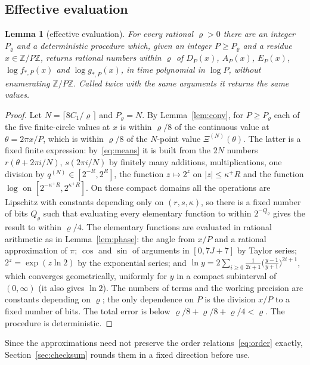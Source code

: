 \documentclass[11pt]{article}
\newtheorem{lemma}{Lemma}[section]
\theoremstyle{definition}
\newcommand{\Z}{\mathbb Z}
\newcommand{\abs}[1]{\lvert #1\rvert}
\newcommand{\ceil}[1]{\lceil #1\rceil}
\begin{document}
\subsection{Effective evaluation}
\begin{lemma}[effective evaluation]\label{lem:eval}
For every rational $\varrho>0$ there are an integer $P_\varrho$ and a deterministic procedure which, given an integer
$P\ge P_\varrho$ and a residue $x\in\Z/P\Z$, returns rational numbers within $\varrho$ of $D_P(x)$, $A_P(x)$,
$E_P(x)$, $\log f_{\ast,P}(x)$ and $\log g_{\ast,P}(x)$, in time polynomial in $\log P$, without enumerating
$\Z/P\Z$. Called twice with the same arguments it returns the same values.
\end{lemma}
\begin{proof}
Let $N=\ceil{8C_1/\varrho}$ and $P_\varrho=N$. By Lemma~\ref{lem:conv}, for $P\ge P_\varrho$ each of the five finite-circle
values at $x$ is within $\varrho/8$ of the continuous value at $\theta=2\pi x/P$, which is within $\varrho/8$ of the
$N$-point value $\Xi^{(N)}(\theta)$. The latter is a fixed finite expression: by~\eqref{eq:means} it is built from
the $2N$ numbers $r(\theta+2\pi i/N)$, $s(2\pi i/N)$ by finitely many additions, multiplications, one division by
$q^{(N)}\in[2^{-R},2^R]$, the function $z\mapsto2^z$ on $\abs z\le\kappa^+R$ and the function $\log$ on
$[2^{-\kappa^+R},2^{\kappa^+R}]$. On these compact domains all the operations are Lipschitz with constants depending
only on $(r,s,\kappa)$, so there is a fixed number of bits $Q_\varrho$ such that evaluating every elementary function
to within $2^{-Q_\varrho}$ gives the result to within $\varrho/4$. The elementary functions are evaluated in rational
arithmetic as in Lemma~\ref{lem:phase}: the angle from $x/P$ and a rational approximation of $\pi$; $\cos$ and
$\sin$ of arguments in $[0,7J+7]$ by Taylor series; $2^z=\exp(z\ln2)$ by the exponential series; and
$\ln y=2\sum_{i\ge0}\frac1{2i+1}\bigl(\frac{y-1}{y+1}\bigr)^{2i+1}$, which converges geometrically, uniformly for $y$
in a compact subinterval of $(0,\infty)$ (it also gives $\ln2$). The numbers of terms and the working precision are
constants depending on $\varrho$; the only dependence on $P$ is the division $x/P$ to a fixed number of bits. The
total error is below $\varrho/8+\varrho/8+\varrho/4<\varrho$. The procedure is deterministic.
\end{proof}
Since the approximations need not preserve the order relations~\eqref{eq:order} exactly, Section~\ref{sec:checksum}
rounds them in a fixed direction before use.
\end{document}
